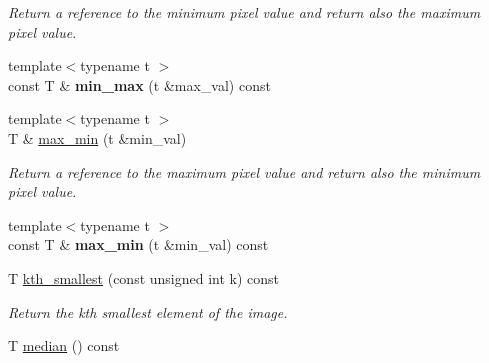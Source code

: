 \begin{DoxyCompactItemize}
\begin{DoxyCompactList}\small\item\em Return a reference to the minimum pixel value and return also the maximum pixel value. \item\end{DoxyCompactList}\item 
\hypertarget{structcimg__library_1_1CImg_a55d6667ec189587a86657535bc70bb4a}{
{\footnotesize template$<$typename t $>$ }\\const T \& {\bfseries min\_\-max} (t \&max\_\-val) const }
\label{structcimg__library_1_1CImg_a55d6667ec189587a86657535bc70bb4a}

\item 
\hypertarget{structcimg__library_1_1CImg_aa17b9040f9296b7fe2d487a7d20e8eac}{
{\footnotesize template$<$typename t $>$ }\\T \& \hyperlink{structcimg__library_1_1CImg_aa17b9040f9296b7fe2d487a7d20e8eac}{max\_\-min} (t \&min\_\-val)}
\label{structcimg__library_1_1CImg_aa17b9040f9296b7fe2d487a7d20e8eac}

\begin{DoxyCompactList}\small\item\em Return a reference to the maximum pixel value and return also the minimum pixel value. \item\end{DoxyCompactList}\item 
\hypertarget{structcimg__library_1_1CImg_a6c395452fd52c44306051def2da14251}{
{\footnotesize template$<$typename t $>$ }\\const T \& {\bfseries max\_\-min} (t \&min\_\-val) const }
\label{structcimg__library_1_1CImg_a6c395452fd52c44306051def2da14251}

\item 
\hypertarget{structcimg__library_1_1CImg_a93d6b348517590d019471ddeeb3e938b}{
T \hyperlink{structcimg__library_1_1CImg_a93d6b348517590d019471ddeeb3e938b}{kth\_\-smallest} (const unsigned int k) const }
\label{structcimg__library_1_1CImg_a93d6b348517590d019471ddeeb3e938b}

\begin{DoxyCompactList}\small\item\em Return the kth smallest element of the image. \item\end{DoxyCompactList}\item 
\hypertarget{structcimg__library_1_1CImg_aa74ed6a750d63ac3effff5edc06ad62f}{
T \hyperlink{structcimg__library_1_1CImg_aa74ed6a750d63ac3effff5edc06ad62f}{median} () const }
\label{structcimg__library_1_1CImg_aa74ed6a750d63ac3effff5edc06ad62f}


\end{DoxyCompactItemize}
